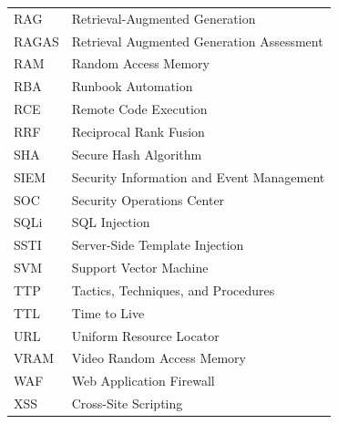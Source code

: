 \documentclass[12pt,a4paper]{report}
\begin{document}
\begin{longtable}{lp{}}
RAG & Retrieval-Augmented Generation \\
RAGAS & Retrieval Augmented Generation Assessment \\
RAM & Random Access Memory \\
RBA & Runbook Automation \\
RCE & Remote Code Execution \\
RRF & Reciprocal Rank Fusion \\
SHA & Secure Hash Algorithm \\
SIEM & Security Information and Event Management \\
SOC & Security Operations Center \\
SQLi & SQL Injection \\
SSTI & Server-Side Template Injection \\
SVM & Support Vector Machine \\
TTP & Tactics, Techniques, and Procedures \\
TTL & Time to Live \\
URL & Uniform Resource Locator \\
VRAM & Video Random Access Memory \\
WAF & Web Application Firewall \\
XSS & Cross-Site Scripting \\
\bottomrule
\end{longtable}
\newpage
\tableofcontents

\newpage
\onehalfspacing %

\setcounter{table}{0}
\setcounter{figure}{0}






\newpage
\singlespacing %
\end{document}
